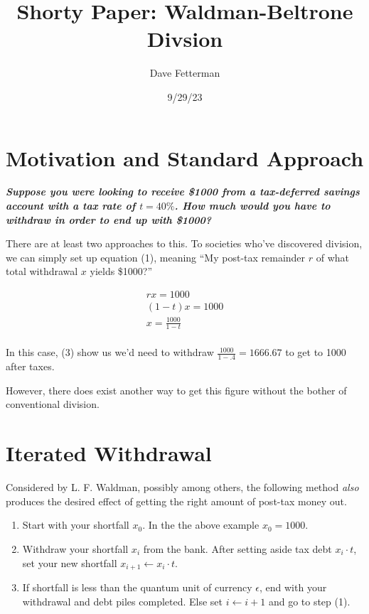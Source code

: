 \documentclass[11pt, oneside]{article} 	%
\title{Shorty Paper: Waldman-Beltrone Divsion}
\author{Dave Fetterman}
\affil{Obviously Unemployed}
\date{9/29/23}
\begin{document}
\maketitle

\section{Motivation and Standard Approach}

\textbf{\emph{Suppose you were looking to receive \$1000 from a tax-deferred savings account with a tax rate of $t=40\%$.  How much would you have to withdraw in order to end up with \$1000? }}

There are at least two approaches to this.  To societies who've discovered division, we can simply set up equation (1), meaning ``My post-tax remainder $r$ of what total withdrawal $x$ yields 
\$1000?''

\begin{align}
rx = 1000 \\
(1-t)x = 1000 \\
x = \frac{1000}{1-t} \\ 
\end{align}

In this case, (3) show us we'd need to withdraw $\frac{1000}{1-.4} = 1666.67$ to get to 1000 after taxes.

However, there does exist another way to get this figure without the bother of conventional division.

\section{Iterated Withdrawal}

Considered by L. F. Waldman, possibly among others, the following method \emph{also} produces the desired effect of getting the right amount of post-tax money out.
\begin{enumerate}
\item Start with your shortfall $x_0$. In the the above example $x_0 = 1000$.
\item Withdraw your shortfall $x_i$ from the bank.  After setting aside tax debt $x_i \cdot t$, set your new shortfall $x_{i+1} \leftarrow x_i \cdot t$.
\item If shortfall is less than the quantum unit of currency $\epsilon$, end with your withdrawal and debt piles completed.  Else set $i \leftarrow i+1$ and go to step (1).
\end{enumerate}
\end{document}
